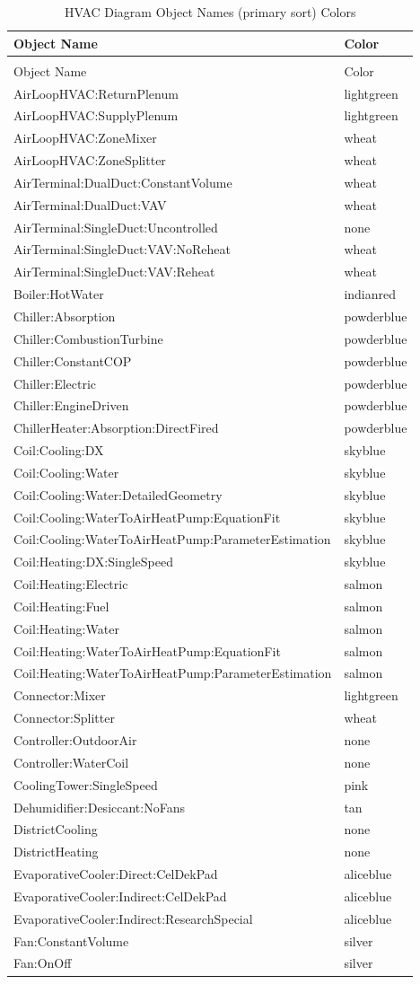 \begin{longtable}[c]{@{}ll@{}}
\caption{HVAC Diagram Object Names (primary sort) Colors \label{table:hvac-diagram-object-names-primary-sort-colors}} \tabularnewline
\toprule
Object Name & Color \tabularnewline
\midrule
\endfirsthead

\caption[]{HVAC Diagram Object Names (primary sort) Colors} \tabularnewline
\toprule
Object Name & Color \tabularnewline
\midrule
\endhead

AirLoopHVAC:ReturnPlenum & lightgreen \tabularnewline
AirLoopHVAC:SupplyPlenum & lightgreen \tabularnewline
AirLoopHVAC:ZoneMixer & wheat \tabularnewline
AirLoopHVAC:ZoneSplitter & wheat \tabularnewline
AirTerminal:DualDuct:ConstantVolume & wheat \tabularnewline
AirTerminal:DualDuct:VAV & wheat \tabularnewline
AirTerminal:SingleDuct:Uncontrolled & none \tabularnewline
AirTerminal:SingleDuct:VAV:NoReheat & wheat \tabularnewline
AirTerminal:SingleDuct:VAV:Reheat & wheat \tabularnewline
Boiler:HotWater & indianred \tabularnewline
Chiller:Absorption & powderblue \tabularnewline
Chiller:CombustionTurbine & powderblue \tabularnewline
Chiller:ConstantCOP & powderblue \tabularnewline
Chiller:Electric & powderblue \tabularnewline
Chiller:EngineDriven & powderblue \tabularnewline
ChillerHeater:Absorption:DirectFired & powderblue \tabularnewline
Coil:Cooling:DX & skyblue \tabularnewline
Coil:Cooling:Water & skyblue \tabularnewline
Coil:Cooling:Water:DetailedGeometry & skyblue \tabularnewline
Coil:Cooling:WaterToAirHeatPump:EquationFit & skyblue \tabularnewline
Coil:Cooling:WaterToAirHeatPump:ParameterEstimation & skyblue \tabularnewline
Coil:Heating:DX:SingleSpeed & skyblue \tabularnewline
Coil:Heating:Electric & salmon \tabularnewline
Coil:Heating:Fuel & salmon \tabularnewline
Coil:Heating:Water & salmon \tabularnewline
Coil:Heating:WaterToAirHeatPump:EquationFit & salmon \tabularnewline
Coil:Heating:WaterToAirHeatPump:ParameterEstimation & salmon \tabularnewline
Connector:Mixer & lightgreen \tabularnewline
Connector:Splitter & wheat \tabularnewline
Controller:OutdoorAir & none \tabularnewline
Controller:WaterCoil & none \tabularnewline
CoolingTower:SingleSpeed & pink \tabularnewline
Dehumidifier:Desiccant:NoFans & tan \tabularnewline
DistrictCooling & none \tabularnewline
DistrictHeating & none \tabularnewline
EvaporativeCooler:Direct:CelDekPad & aliceblue \tabularnewline
EvaporativeCooler:Indirect:CelDekPad & aliceblue \tabularnewline
EvaporativeCooler:Indirect:ResearchSpecial & aliceblue \tabularnewline
Fan:ConstantVolume & silver \tabularnewline
Fan:OnOff & silver \tabularnewline

\end{longtable}

